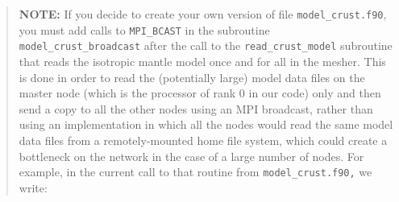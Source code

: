 \documentclass[oneside,english]{book}
\begin{document}
\begin{quote}
\textbf{NOTE:} If you decide to create your own version of file \texttt{model\_crust.f90},
you must add calls to \texttt{MPI\_BCAST} in the subroutine \texttt{model\_crust\_broadcast}
after the call to the \texttt{read\_crust\_model} subroutine that
reads the isotropic mantle model once and for all in the mesher. This
is done in order to read the (potentially large) model data files
on the master node (which is the processor of rank 0 in our code)
only and then send a copy to all the other nodes using an MPI broadcast,
rather than using an implementation in which all the nodes would read
the same model data files from a remotely-mounted home file system,
which could create a bottleneck on the network in the case of a large
number of nodes. For example, in the current call to that routine
from \texttt{model\_crust.f90,} we write:
\end{quote}
\end{document}
